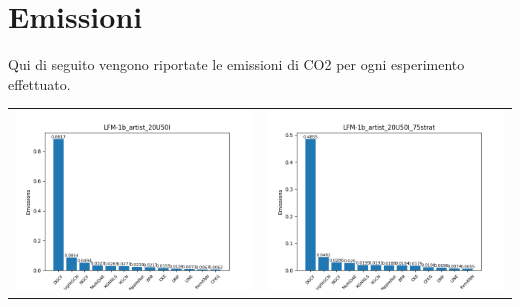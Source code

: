 \section{Emissioni}

Qui di seguito vengono riportate le emissioni di CO2 per ogni esperimento effettuato.

\begin{table}[H]
    \centering
    \footnotesize
    \setlength\tabcolsep{0pt}
    \begin{tabularx}{\textwidth}{|X|X|}
        \hline
        \includegraphics[width=\linewidth, trim=0 0 0 0]{images/emissions_LFM-1b_artist_20U50I.png} &
        \includegraphics[width=\linewidth, trim=0 0 0 0]{images/emissions_LFM-1b_artist_20U50I_75strat.png} \\

\end{tabularx}
\end{table}
